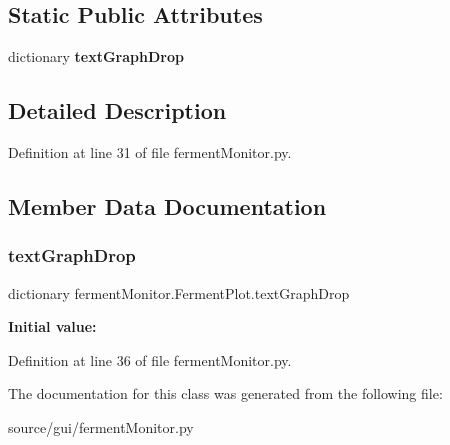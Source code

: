 \subsection*{Static Public Attributes}
\begin{DoxyCompactItemize}
\item 
dictionary {\bfseries text\+Graph\+Drop}
\end{DoxyCompactItemize}


\subsection{Detailed Description}


Definition at line 31 of file ferment\+Monitor.\+py.



\subsection{Member Data Documentation}
\mbox{\label{classferment_monitor_1_1_ferment_plot_ac083563903d770f01a201a747e72ce86}} 
\subsubsection{\texorpdfstring{textGraphDrop}{textGraphDrop}}
{\footnotesize\ttfamily dictionary ferment\+Monitor.\+Ferment\+Plot.\+text\+Graph\+Drop\hspace{0.3cm}{\ttfamily [static]}}

{\bfseries Initial value\+:}
\begin{DoxyCode}{0}
\DoxyCodeLine{=  \{}
\DoxyCodeLine{        \textcolor{stringliteral}{"Temperature"}: \textcolor{stringliteral}{"Temp"},}
\DoxyCodeLine{        \textcolor{stringliteral}{"Specific Gravity"} : \textcolor{stringliteral}{"Sg"},}
\DoxyCodeLine{        \textcolor{stringliteral}{"Volume"} : \textcolor{stringliteral}{"Volume"}}
\DoxyCodeLine{    \}}

\end{DoxyCode}


Definition at line 36 of file ferment\+Monitor.\+py.



The documentation for this class was generated from the following file\+:\begin{DoxyCompactItemize}
\item 
source/gui/ferment\+Monitor.\+py\end{DoxyCompactItemize}
